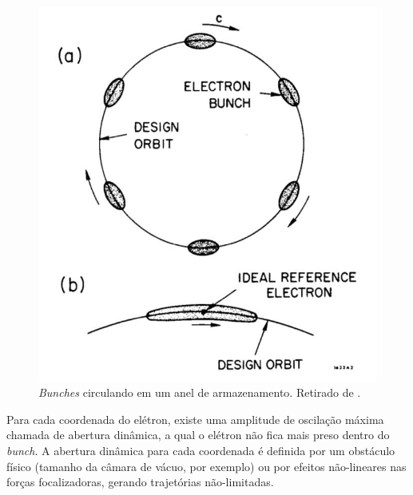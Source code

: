 \begin{figure}[!htb]
	\centering
	\includegraphics[width=0.55\linewidth]{./Figuras/fig2.jpeg}
	\caption{\textit{Bunches} circulando em um anel de armazenamento. Retirado de 							\cite{sands1970physics}.}
	\label{fig:fig2}
\end{figure}
	
Para cada coordenada do elétron, existe uma amplitude de oscilação máxima chamada de abertura dinâmica, a qual o elétron não fica mais preso dentro do \textit{bunch}. A abertura dinâmica para cada coordenada é definida por um obstáculo físico (tamanho da câmara de vácuo, por exemplo) ou por efeitos não-lineares nas forças focalizadoras, gerando trajetórias não-limitadas.